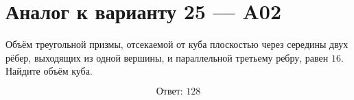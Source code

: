 \documentclass[12pt,a4paper]{article}
\begin{document}
\section*{Аналог к варианту 25 — A02}

Объём треугольной призмы, отсекаемой от куба плоскостью через середины двух рёбер, выходящих из одной вершины, и параллельной третьему ребру, равен \(16\). Найдите объём куба.

\begin{center}
\end{center}

\[
\boxed{\text{Ответ: }128}
\]
\end{document}
